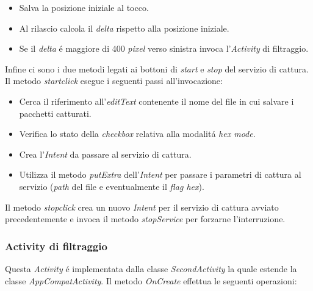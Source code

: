 \documentclass[12pt]{article} %
\begin{document}
\begin{itemize}
\item Salva la posizione iniziale al tocco.
\item Al rilascio calcola il \textit{delta} rispetto alla posizione iniziale.
\item Se il \textit{delta} \'e maggiore di 400 \textit{pixel} verso sinistra invoca l'\textit{Activity} di filtraggio.  
\end{itemize}

Infine ci sono i due metodi legati ai bottoni di \textit{start} e \textit{stop} del servizio di cattura. Il metodo \textit{startclick} esegue i seguenti passi all'invocazione:

\begin{itemize}
\item Cerca il riferimento all'\textit{editText} contenente il nome del file in cui salvare i pacchetti catturati.
\item Verifica lo stato della \textit{checkbox} relativa alla modalit\'a \textit{hex mode}.
\item Crea l'\textit{Intent} da passare al servizio di cattura.
\item Utilizza il metodo \textit{putExtra} dell'\textit{Intent} per passare i parametri di cattura al servizio (\textit{path} del file e eventualmente il \textit{flag hex}).
\end{itemize}

Il metodo \textit{stopclick} crea un nuovo \textit{Intent} per il servizio di cattura avviato precedentemente e invoca il metodo \textit{stopService} per forzarne l'interruzione.

\subsubsection{Activity di filtraggio}
Questa \textit{Activity} \'e implementata dalla classe \textit{SecondActivity} la quale estende la classe \textit{AppCompatActivity}. Il metodo \textit{OnCreate} effettua le seguenti operazioni:
\end{document}
